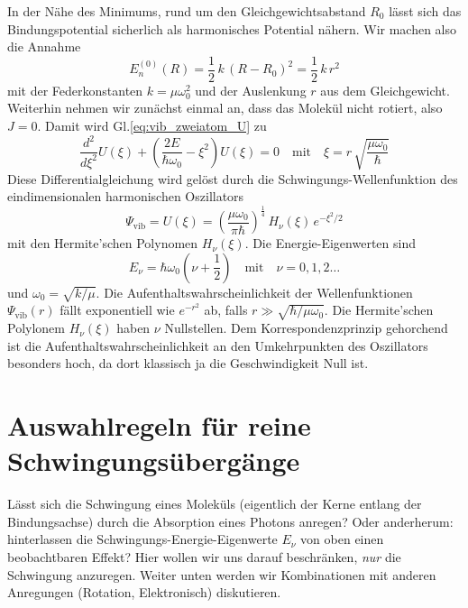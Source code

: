 In der Nähe des Minimums, rund um den Gleichgewichtsabstand $R_0$ lässt sich das Bindungspotential sicherlich als harmonisches Potential nähern. Wir machen also die Annahme
\begin{equation}
E_n^{(0)}(R)  = \frac{1}{2} \, k \, (R - R_0 )^2 = \frac{1}{2} \, k \, r^2 
\end{equation}
mit der Federkonstanten $k = \mu \omega_0^2$ und der Auslenkung $r$ aus dem Gleichgewicht. Weiterhin nehmen wir zunächst einmal an, dass das Molekül nicht rotiert, also $J=0$.  Damit wird Gl.\ref{eq:vib_zweiatom_U} zu
\begin{equation}
 \frac{d^2}{d \xi^2} U(\xi) + \left( \frac{2 E }{\hbar \omega_0}  - \xi^2  \right) U(\xi) = 0 \quad \text{mit} \quad \xi =  r \, \sqrt{\frac{\mu \omega_0}{\hbar}  }
\end{equation}
Diese Differentialgleichung wird gelöst durch die Schwingungs-Wellenfunktion des eindimensionalen harmonischen Oszillators
\begin{equation}
\Psi_\text{vib} =  U(\xi) = \left(\frac{\mu \omega_0}{\pi \hbar} \right)^{\frac{1}{4}} \,
 H_\nu(\xi) \, e^{- \xi^2 /2}
\end{equation}
mit den Hermite'schen Polynomen $H_\nu(\xi)$.
Die Energie-Eigenwerten sind
\begin{equation}
E_\nu = \hbar \omega_0 (\nu + \frac{1}{2} ) \quad \text{mit} \quad \nu = 0, 1, 2 \dots
\end{equation}
und $\omega_0 = \sqrt{k / \mu}$. Die Aufenthaltswahrscheinlichkeit der Wellenfunktionen $\Psi_\text{vib}(r)$ fällt exponentiell wie $e^{-r^2}$ ab, falls $r \gg \sqrt{\hbar / \mu \omega_0}$. Die Hermite'schen Polylonem $H_\nu(\xi)$ haben $\nu$ Nullstellen. Dem Korrespondenzprinzip gehorchend ist die 
Aufenthaltswahrscheinlichkeit an den Umkehrpunkten des Oszillators besonders hoch, da dort klassisch ja die Geschwindigkeit Null ist.


\section{Auswahlregeln für reine Schwingungsübergänge}

Lässt sich die Schwingung eines Moleküls (eigentlich der Kerne entlang der Bindungsachse) durch die Absorption eines Photons anregen? Oder anderherum: hinterlassen die Schwingungs-Energie-Eigenwerte $E_\nu$ von oben einen beobachtbaren Effekt? Hier wollen wir uns darauf beschränken, \emph{nur} die Schwingung anzuregen. Weiter unten werden wir Kombinationen mit anderen Anregungen (Rotation, Elektronisch) diskutieren.

